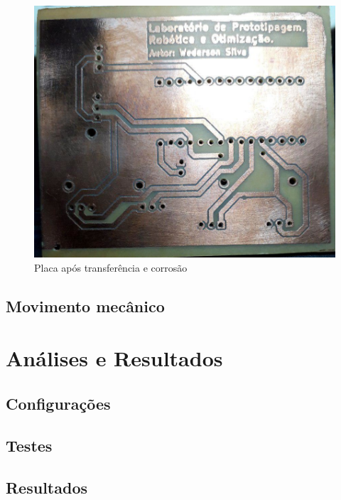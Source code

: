 \documentclass{ufpatcc}
\begin{document}
		\begin{figure}[h!]
  		\label{fig:phenolic-glove-module1}
			\centering
  		\includegraphics[scale=0.3]{../pictures/phenolic-glove-module1.jpg}
			\caption{Placa após transferência e corrosão}
		\end{figure}
		
		\section{Movimento mecânico}


	\chapter{Análises e Resultados}

		\section{Configurações}

		\section{Testes}

		\section{Resultados}
		

\end{document}
